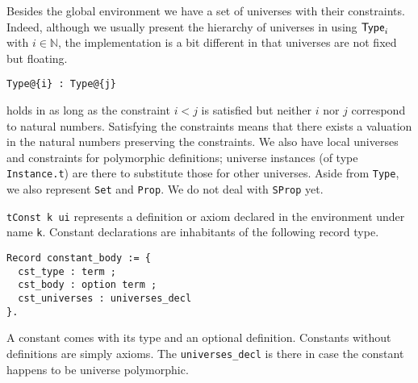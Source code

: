 
Besides the global environment we have a set of universes with their
constraints. Indeed, although we usually present the hierarchy of universes in
\Coq using \(\mathsf{Type}_i\) with \(i \in \mathbb{N}\), the implementation is a bit
different in that universes are not fixed but floating.
\begin{verbatim}
Type@{i} : Type@{j}
\end{verbatim}
holds in \Coq as long as the constraint \(i < j\) is satisfied but neither \(i\)
nor \(j\) correspond to natural numbers. Satisfying the constraints means that
there exists a valuation in the natural numbers preserving the constraints.
We also have local universes and constraints for polymorphic definitions;
universe instances (of type \texttt{Instance.t}) are there to
substitute those for other universes.
Aside from \texttt{Type}, we also represent \texttt{Set}
and \texttt{Prop}. We do not deal with \texttt{SProp} yet.


\texttt{tConst k ui} represents a definition or axiom declared in the
environment under name \texttt{k}. Constant declarations are
inhabitants of the following record type.
\begin{verbatim}
Record constant_body := {
  cst_type : term ;
  cst_body : option term ;
  cst_universes : universes_decl
}.
\end{verbatim}
A constant comes with its type and an optional definition. Constants without
definitions are simply axioms.
The \texttt{universes_decl} is there in case the constant happens to
be universe polymorphic.


